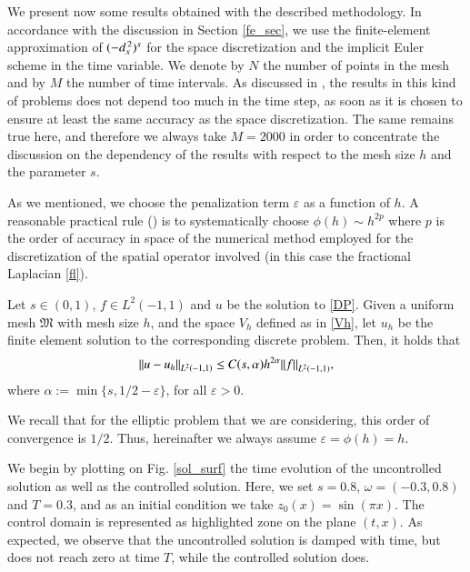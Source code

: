 We present now some results obtained with the described methodology. In accordance with the discussion in Section \ref{fe_sec}, we use the finite-element approximation of $(-d_x^{\,2})^{s}$ for the space discretization and the implicit Euler scheme in the time variable. We denote by $N$ the number of points in the mesh and by $M$ the number of time intervals. As discussed in \cite{boyer2011uniform}, the results in this kind of problems does not depend too much in the time step, as soon as it is chosen to ensure at least the same accuracy as the space discretization. The same remains true here, and therefore we always take $M=2000$ in order to concentrate the discussion on the dependency of the results with respect to the mesh size $h$ and the parameter $s$.

As we mentioned, we choose the penalization term $\varepsilon$ as a function of $h$. A reasonable practical rule (\cite{boyer2013penalised}) is to systematically choose $\phi(h)\sim h^{2p}$ where $p$ is the order of accuracy in space of the numerical method employed for the discretization of the spatial operator involved (in this case the fractional Laplacian \eqref{fl}).

\begin{theorem}
Let $s\in(0,1)$, $f\in L^2(-1,1)$ and $u$ be the solution to \eqref{DP}. Given a uniform mesh $\mathfrak{M}$ with mesh size $h$,
and the space $V_h$ defined as in \eqref{Vh}, let $u_h$ be the finite element solution to the corresponding discrete 
problem. Then, it holds that
\begin{align}\label{error_l2}
	{\left\|u-u_h\right\|}_{L^2(-1,1)}\leq C(s,\alpha)h^{2\alpha}{\left\|f\right\|}_{L^2(-1,1)},
\end{align}
where $\alpha:=\min\{s, 1/2 -\varepsilon\}$, for all $\varepsilon>0$.
\end{theorem}%



 We recall that for the elliptic problem that we are considering, this order of convergence is $1/2$. Thus, hereinafter we always assume $\varepsilon=\phi(h)=h$.

We begin by plotting on Fig.  \ref{sol_surf} the time evolution of the uncontrolled solution as well as the controlled solution. Here, we set $s=0.8$, $\omega=(-0.3,0.8)$ and $T=0.3$, and as an initial condition we take $z_0(x) = \sin(\pi x)$. The control domain is represented as highlighted zone on the plane $(t,x)$. As expected, we observe that the uncontrolled solution is damped with time, but does not reach zero at time $T$, while the controlled solution does. 

